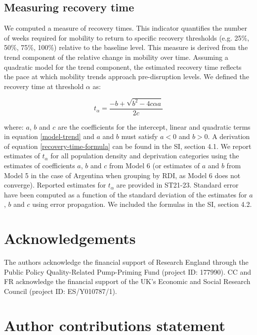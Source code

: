 \documentclass[fleqn,10pt]{wlscirep}
\begin{document}
\subsection*{Measuring recovery time}

We computed a measure of recovery times. This indicator quantifies the number of weeks required for mobility to return to specific recovery thresholds (e.g. 25\%, 50\%, 75\%, 100\%) relative to the baseline level. This measure is derived from the trend component of the relative change in mobility over time. Assuming a quadratic model for the trend component, the estimated recovery time reflects the pace at which mobility trends approach pre-disruption levels. We defined the recovery time at threshold $\alpha$ as:

\begin{equation}\label{recovery-time-formula}
    t_{\alpha} = \dfrac{-b + \sqrt{b^2-4c \alpha a}}{2c}
\end{equation}

where: $a$, $b$ and $c$ are the coefficients for the intercept, linear and quadratic terms in equation \eqref{model-trend} and $a$ and $b$ must satisfy $a<0$ and $b>0$. A derivation of equation \eqref{recovery-time-formula} can be found in the SI, section 4.1. We report estimates of $t_{\alpha}$ for all population density and deprivation categories using the estimates of coefficients $a$, $b$ and $c$ from Model 6 (or estimates of $a$ and $b$ from Model 5 in the case of Argentina when grouping by RDI, as Model 6 does not converge). Reported estimates for $t_{\alpha}$ are provided in ST21-23. Standard error have been computed as a function of the standard deviation of the estimates for $a$, $b$ and $c$ using error propagation. We included the formulas in the SI, section 4.2.



\section*{Acknowledgements}

The authors acknowledge the financial support of Research England through the Public Policy Quality-Related Pump-Priming Fund (project ID: 177990). CC and FR acknowledge the financial support of the UK's Economic and Social Research Council (project ID: ES/Y010787/1).

\section*{Author contributions statement}
\end{document}
